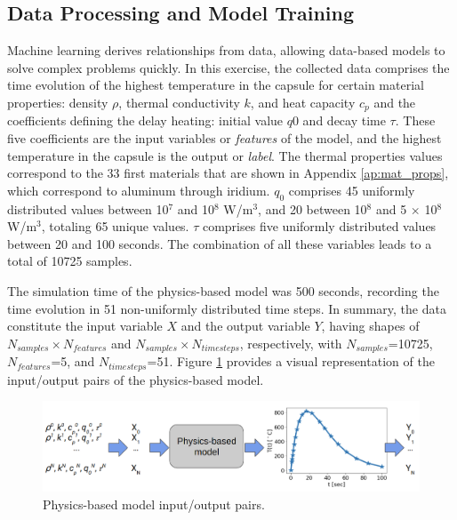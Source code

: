 \subsection{Data Processing and Model Training}
\label{sec:datapros}

Machine learning derives relationships from data, allowing data-based models to solve complex problems quickly.
In this exercise, the collected data comprises the time evolution of the highest temperature in the capsule for certain material properties: density $\rho$, thermal conductivity $k$, and heat capacity $c_p$ and the coefficients defining the delay heating: initial value $q0$ and decay time $\tau$.
These five coefficients are the input variables or \textit{features} of the model, and the highest temperature in the capsule is the output or \textit{label}.
The thermal properties values correspond to the 33 first materials that are shown in Appendix \ref{ap:mat_props}, which correspond to aluminum through iridium.
$q_0$ comprises 45 uniformly distributed values between 10$^7$ and 10$^8$ W/m$^3$, and 20 between 10$^8$ and 5 $\times$ 10$^8$ W/m$^3$, totaling 65 unique values.
$\tau$ comprises five uniformly distributed values between 20 and 100 seconds.
The combination of all these variables leads to a total of 10725 samples.

The simulation time of the physics-based model was 500 seconds, recording the time evolution in 51 non-uniformly distributed time steps.
In summary, the data constitute the input variable $X$ and the output variable $Y$, having shapes of $N_{samples} \times N_{features}$ and $N_{samples} \times N_{timesteps}$, respectively, with $N_{samples}$=10725, $N_{features}$=5, and $N_{timesteps}$=51.
Figure \ref{fig:tf-data1} provides a visual representation of the input/output pairs of the physics-based model.

\begin{figure}[htbp!] %
    \centering
    \includegraphics[width=0.85\linewidth]{figures/data-process}
    \hfill
    \caption{Physics-based model input/output pairs.}
    \label{fig:tf-data1}
\end{figure}

